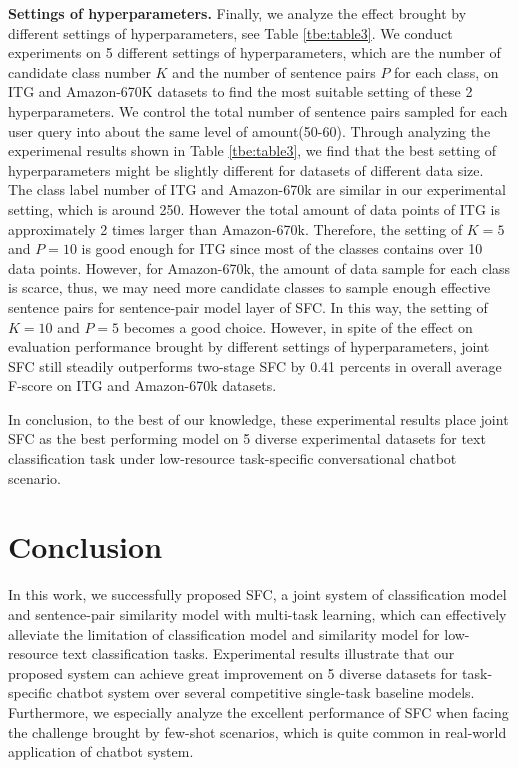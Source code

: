 \documentclass[letterpaper]{article} %
\begin{document}
  \textbf{Settings  of  hyperparameters.} Finally, we analyze the effect brought
  by  different  settings  of  hyperparameters,  see  Table \ref{tbe:table3}. We
  conduct  experiments on 5 different settings of hyperparameters, which are the
  number  of candidate class number $K$ and the number of sentence pairs $P$ for
  each  class, on ITG and Amazon-670K datasets to find the most suitable setting
  of  these  2  hyperparameters.  We  control the total number of sentence pairs
  sampled  for  each  user  query  into  about  the same level of amount(50-60).
  Through  analyzing the experimenal results shown in Table \ref{tbe:table3}, we
  find  that the best setting of hyperparameters might be slightly different for
  datasets of different data size. The class label number of ITG and Amazon-670k
  are  similar  in  our  experimental  setting, which is around 250. However the
  total  amount  of  data  points  of  ITG  is approximately 2 times larger than
  Amazon-670k. Therefore, the setting of $K=5$ and $P=10$ is good enough for ITG
  since  most  of  the  classes  contains  over  10  data  points.  However, for
  Amazon-670k,  the amount of data sample for each class is scarce, thus, we may
  need  more  candidate  classes  to  sample enough effective sentence pairs for
  sentence-pair model layer of SFC. In this way, the setting of $K=10$ and $P=5$
  becomes a good choice. However, in spite of the effect on evaluation performance brought by different settings of hyperparameters, joint SFC still steadily outperforms two-stage SFC by 0.41 percents in overall average F-score on ITG and Amazon-670k datasets. 

  In  conclusion,  to  the best of our knowledge, these experimental results place joint SFC as the
  best   performing   model   on   5  diverse  experimental  datasets  for  text
  classification  task  under  low-resource task-specific conversational chatbot
  scenario.

  \section{Conclusion}
  In  this  work, we successfully proposed SFC, a joint system of classification
  model  and  sentence-pair similarity model with multi-task learning, which can
  effectively  alleviate  the  limitation of classification model and similarity
  model   for  low-resource  text  classification  tasks.  Experimental  results
  illustrate that our proposed system can achieve great improvement on 5 diverse
  datasets for task-specific chatbot system over several competitive single-task
  baseline  models. Furthermore, we especially analyze the excellent performance
  of SFC when facing the challenge brought by few-shot scenarios, which is quite
  common in real-world application of chatbot system.

  
  
\end{document}

